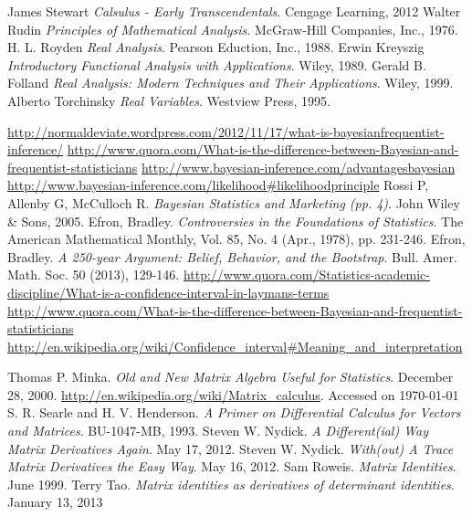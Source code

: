 \documentclass{book}
\begin{document}
\begin{thebibliography}{100} %
 James Stewart {\em{Calsulus - Early Transcendentals}}. Cengage Learning, 2012
 Walter Rudin {\em{Principles of Mathematical Analysis}}. McGraw-Hill Companies, Inc., 1976.
 H. L. Royden {\em{Real Analysis}}. Pearson Eduction, Inc., 1988.
 Erwin Kreyszig {\em{Introductory Functional Analysis with Applications}}. Wiley, 1989.
 Gerald B. Folland {\em{Real Analysis: Modern Techniques and Their Applications}}. Wiley, 1999.
 Alberto Torchinsky {\em{Real Variables}}. Westview Press, 1995.

 {\url{http://normaldeviate.wordpress.com/2012/11/17/what-is-bayesianfrequentist-inference/}}
 {\url{http://www.quora.com/What-is-the-difference-between-Bayesian-and-frequentist-statisticians}}
 {\url{http://www.bayesian-inference.com/advantagesbayesian}}
 {\url{http://www.bayesian-inference.com/likelihood#likelihoodprinciple}}
 Rossi P, Allenby G, McCulloch R. {\emph{Bayesian Statistics and Marketing (pp. 4)}}. John Wiley \& Sons, 2005.
 Efron, Bradley. {\emph{Controversies in the Foundations of Statistics}}. The American Mathematical Monthly, Vol. 85, No. 4 (Apr., 1978), pp. 231-246.
 Efron, Bradley. {\emph{A 250-year Argument: Belief, Behavior, and the Bootstrap}}. Bull. Amer. Math. Soc. 50 (2013), 129-146.
 {\url{http://www.quora.com/Statistics-academic-discipline/What-is-a-confidence-interval-in-laymans-terms}}
 {\url{http://www.quora.com/What-is-the-difference-between-Bayesian-and-frequentist-statisticians}}
 {\url{http://en.wikipedia.org/wiki/Confidence_interval#Meaning_and_interpretation}}

 Thomas P. Minka. {\em{Old and New Matrix Algebra Useful for Statistics}}. December 28, 2000.
 \url{http://en.wikipedia.org/wiki/Matrix_calculus}. Accessed on \today
{} S. R. Searle and H. V. Henderson. {\em{A Primer on Differential Calculus for Vectors and Matrices}}. BU-1047-MB, 1993.
 Steven W. Nydick. {\em{A Different(ial) Way Matrix Derivatives Again}}. May 17, 2012.
 Steven W. Nydick. {\em{With(out) A Trace Matrix Derivatives the Easy Way}}. May 16, 2012.
 Sam Roweis. {\em{Matrix Identities}}. June 1999.
 Terry Tao. {\em{Matrix identities as derivatives of determinant identities}}. January 13, 2013
\end{thebibliography}
\end{document}
